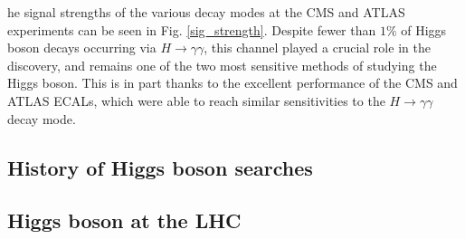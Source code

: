  he signal strengths of the various decay modes at the CMS and ATLAS experiments can be seen in Fig. \ref{sig_strength}. Despite fewer than $1\%$ of Higgs boson decays occurring via $H \rightarrow \gamma \gamma$, this channel played a crucial role in the discovery, and remains one of the two most sensitive methods of studying the Higgs boson. This is in part thanks to the excellent performance of the CMS and ATLAS ECALs, which were able to reach similar sensitivities to the $H\rightarrow \gamma \gamma$ decay mode.

  \subsection{History of Higgs boson searches}
  \subsection{Higgs boson at the LHC}
